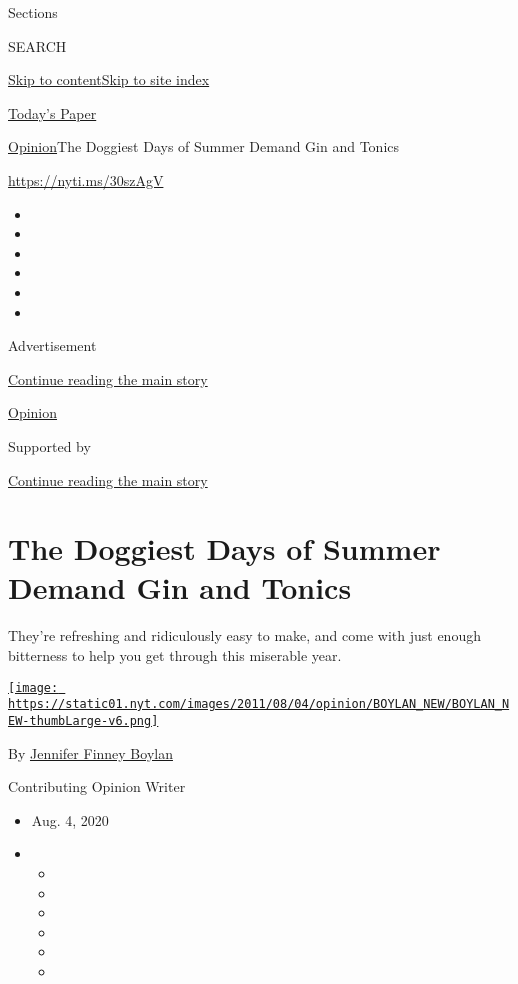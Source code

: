 Sections

SEARCH

\protect\hyperlink{site-content}{Skip to
content}\protect\hyperlink{site-index}{Skip to site index}

\href{https://myaccount.nytimes.com/auth/login?response_type=cookie\&client_id=vi}{}

\href{https://www.nytimes.com/section/todayspaper}{Today's Paper}

\href{/section/opinion}{Opinion}\textbar{}The Doggiest Days of Summer
Demand Gin and Tonics

\url{https://nyti.ms/30szAgV}

\begin{itemize}
\item
\item
\item
\item
\item
\item
\end{itemize}

Advertisement

\protect\hyperlink{after-top}{Continue reading the main story}

\href{/section/opinion}{Opinion}

Supported by

\protect\hyperlink{after-sponsor}{Continue reading the main story}

\hypertarget{the-doggiest-days-of-summer-demand-gin-and-tonics}{%
\section{The Doggiest Days of Summer Demand Gin and
Tonics}\label{the-doggiest-days-of-summer-demand-gin-and-tonics}}

They're refreshing and ridiculously easy to make, and come with just
enough bitterness to help you get through this miserable year.

\href{https://topics.nytimes.com/top/reference/timestopics/people/b/jennifer_finney_boylan/index.html}{\texttt{[image: https://static01.nyt.com/images/2011/08/04/opinion/BOYLAN\_NEW/BOYLAN\_NEW-thumbLarge-v6.png]}}

By
\href{https://topics.nytimes.com/top/reference/timestopics/people/b/jennifer_finney_boylan/index.html}{Jennifer
Finney Boylan}

Contributing Opinion Writer

\begin{itemize}
\item
  Aug. 4, 2020
\item
  \begin{itemize}
  \item
  \item
  \item
  \item
  \item
  \item
  \end{itemize}
\end{itemize}

